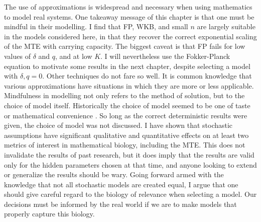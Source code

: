 The use of approximations is widespread and necessary when using mathematics to model real systems. 
One takeaway message of this chapter is that one must be mindful in their modelling. 
I find that FP, WKB, and small $n$ are largely suitable in the models considered here, in that they recover the correct exponential scaling of the MTE with carrying capacity. 
The biggest caveat is that FP fails for low values of $\delta$ and $q$, and at low $K$.  
I will nevertheless use the Fokker-Planck equation to motivate some results in the next chapter, despite selecting a model with $\delta,q = 0$. 
Other techniques do not fare so well. 
It is common knowledge that various approximations have situations in which they are more or less applicable. 
Mindfulness in modelling not only refers to the method of solution, but to the choice of model itself. 
Historically the choice of model seemed to be one of taste or mathematical convenience \cite{Greenhalgh1990,Ovaskainen2010,Assaf2010,Allen2003,Norden1982,Newman2004,Allen2005,Fujita1953,Nasell2001}. 
So long as the correct deterministic results were given, the choice of model was not discussed. 
I have shown that stochastic assumptions have significant qualitative and quantitative effects on at least two metrics of interest in mathematical biology, including the MTE.
This does not invalidate the results of past research, but it does imply that the results are valid only for the hidden parameters chosen at that time, and anyone looking to extend or generalize the results should be wary. %
Going forward armed with the knowledge that not all stochastic models are created equal, I argue that one should give careful regard to the biology of relevance when selecting a model. 
Our decisions must be informed by the real world if we are to make models that properly capture this biology. 






